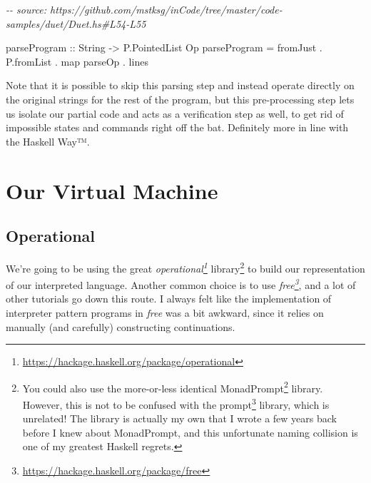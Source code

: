 \documentclass[]{article}
\newenvironment{Shaded}{}{}
\newcommand{\CommentTok}[1]{\textcolor[rgb]{0.38,0.63,0.69}{\textit{#1}}}
\newcommand{\DataTypeTok}[1]{\textcolor[rgb]{0.56,0.13,0.00}{#1}}
\newcommand{\FunctionTok}[1]{\textcolor[rgb]{0.02,0.16,0.49}{#1}}
\newcommand{\NormalTok}[1]{#1}
\newcommand{\OperatorTok}[1]{\textcolor[rgb]{0.40,0.40,0.40}{#1}}
\newcommand{\OtherTok}[1]{\textcolor[rgb]{0.00,0.44,0.13}{#1}}
\renewcommand{\href}[2]{#2\footnote{\url{#1}}}
\begin{document}
\begin{Shaded}
\begin{Highlighting}[]
\CommentTok{{-}{-} source: https://github.com/mstksg/inCode/tree/master/code{-}samples/duet/Duet.hs\#L54{-}L55}

\OtherTok{parseProgram ::} \DataTypeTok{String} \OtherTok{{-}\textgreater{}} \DataTypeTok{P.PointedList} \DataTypeTok{Op}
\NormalTok{parseProgram }\OtherTok{=}\NormalTok{ fromJust }\OperatorTok{.}\NormalTok{ P.fromList }\OperatorTok{.} \FunctionTok{map}\NormalTok{ parseOp }\OperatorTok{.} \FunctionTok{lines}
\end{Highlighting}
\end{Shaded}

Note that it is possible to skip this parsing step and instead operate directly
on the original strings for the rest of the program, but this pre-processing
step lets us isolate our partial code and acts as a verification step as well,
to get rid of impossible states and commands right off the bat. Definitely more
in line with the Haskell Way™.

\section{Our Virtual Machine}\label{our-virtual-machine}

\subsection{Operational}\label{operational}

We're going to be using the great
\emph{\href{https://hackage.haskell.org/package/operational}{operational}}
library\footnote{You could also use the more-or-less identical
  \href{https://hackage.haskell.org/package/operational}{MonadPrompt} library.
  However, this is not to be confused with the
  \href{https://hackage.haskell.org/package/prompt}{prompt} library, which is
  unrelated! The library is actually my own that I wrote a few years back before
  I knew about MonadPrompt, and this unfortunate naming collision is one of my
  greatest Haskell regrets.} to build our representation of our interpreted
language. Another common choice is to use
\emph{\href{https://hackage.haskell.org/package/free}{free}}, and a lot of other
tutorials go down this route. I always felt like the implementation of
interpreter pattern programs in \emph{free} was a bit awkward, since it relies
on manually (and carefully) constructing continuations.
\end{document}
